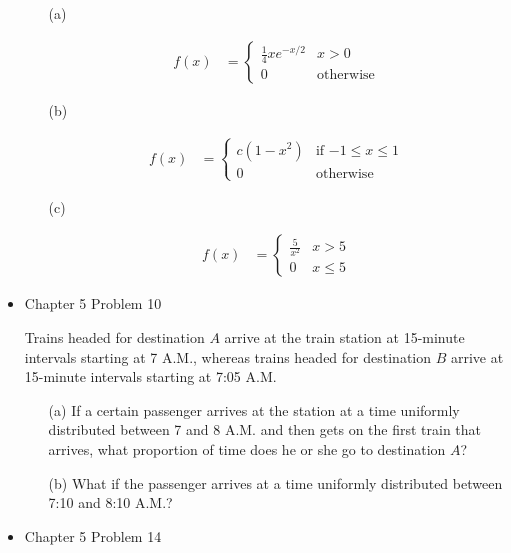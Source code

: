 \documentclass[11pt]{article}
\begin{document}
\begin{itemize}
    \begin{itemize}
    \item[(a)] 
    
    \begin{align*}
   f(x) &= \begin{cases}
   \frac{1}{4}x e^{-x/2}& x > 0 \\
   0 & \text{otherwise}
   \end{cases}
   \end{align*}
   
   \item[(b)] 
   
   \begin{align*}
   f(x) &= \begin{cases}
   c (1 - x^2)& \text{if $-1 \leq x \leq 1$} \\
   0 & \text{otherwise}
   \end{cases}
   \end{align*}
   
   \item[(c)]
   
   \begin{align*}
   f(x) &= \begin{cases}
   \frac{5}{x^2} & x > 5 \\
   0 & x \leq 5
   \end{cases}
   \end{align*}
   
   
    \end{itemize}

    \item
    Chapter 5 Problem 10
    
    Trains headed for destination $A$ arrive at the train station at 15-minute intervals starting at 7 A.M., whereas trains headed for destination $B$ arrive at 15-minute intervals starting at 7:05 A.M.
    
    \begin{itemize}
    \item[(a)] If a certain passenger arrives at the station at a time uniformly distributed between 7 and 8 A.M. and then gets on the first train that arrives, what proportion of time does he or she go to destination $A$?
    
    \item[(b)] What if the passenger arrives at a time uniformly distributed between 7:10 and 8:10 A.M.?
    \end{itemize}
    

    \item
    Chapter 5 Problem 14
    

\end{itemize}
\end{document}
